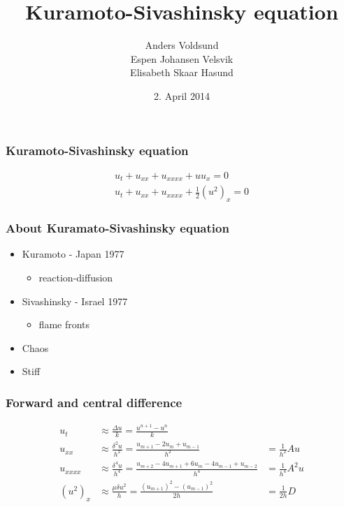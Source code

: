 \documentclass[screen]{beamer}
\title[Kuramoto-Sivashinsky]%
{Kuramoto-Sivashinsky equation}
\author[Author, Anders] %
{Anders Voldsund \\Espen Johansen Velsvik \\Elisabeth Skaar Hasund}
\date{2. April 2014}
\begin{document}
\begin{frame}
\titlepage

\end{frame}

\begin{frame}
\frametitle{Kuramoto-Sivashinsky equation}
\Large
\begin{align*}
u_t + u_{xx} + u_{xxxx} + uu_x = 0 \\
u_t + u_{xx} + u_{xxxx} + \frac{1}{2}(u^2)_x = 0
\end{align*}
\end{frame}


\begin{frame}
\frametitle{About Kuramato-Sivashinsky equation}
\begin{itemize}
\item Kuramoto - Japan 1977
\begin{itemize}
\item reaction-diffusion
\end{itemize}

\item Sivashinsky - Israel 1977
\begin{itemize}
\item flame fronts
\end{itemize}
\item Chaos
\item Stiff

\end{itemize}

\end{frame}


\begin{frame}
\frametitle{Forward and central difference}
\begin{align*}
u_t &\approx \frac{\Delta u}{k} = \frac{u^{n+1}-u^n}{k} \\
u_{xx} &\approx \frac{\delta^2 u}{h^2} = \frac{u_{m+1}-2u_{m}+u_{m-1}}{h^2} &= \frac{1}{h^2}Au \\
u_{xxxx} &\approx \frac{\delta^4 u}{h^4} = \frac{u_{m+2}-4u_{m+1}+6u_m-4u_{m-1}+u_{m-2}}{h^4} &= \frac{1}{h^4}A^2u\\
(u^2)_{x} &\approx \frac{\mu \delta u^2}{h} = \frac{(u_{m+1})^2-(u_{m-1})^2}{2h} &= \frac{1}{2h}D\\
\end{align*}
\end{frame}
\end{document}
